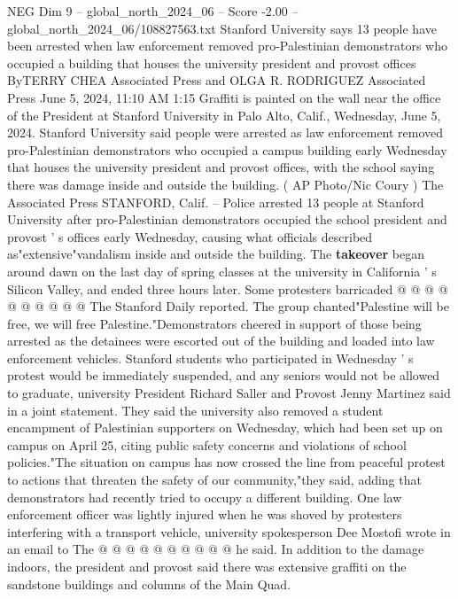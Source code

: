 \begin{textsample}{NEG Dim 9 – global\_north\_2024\_06 – Score -2.00 – global\_north\_2024\_06/108827563.txt}  \label{ex:f9_neg_173}
Stanford University says 13 people have been arrested when law enforcement removed pro-Palestinian demonstrators who occupied a building that houses the university president and provost offices ByTERRY CHEA Associated Press and OLGA R.
RODRIGUEZ Associated Press June 5, 2024, 11:10 AM 1:15 Graffiti is painted on the wall near the office of the President at Stanford University in Palo Alto, Calif., Wednesday, June 5, 2024.
Stanford University said people were arrested as law enforcement removed pro-Palestinian demonstrators who occupied a campus building early Wednesday that houses the university president and provost offices, with the school saying there was damage inside and outside the building. ( AP Photo/Nic Coury ) The Associated Press STANFORD, Calif. -- Police arrested 13 people at Stanford University after pro-Palestinian demonstrators occupied the school president and provost ' s offices early Wednesday, causing what officials described as"extensive"vandalism inside and outside the building.
The \textbf{takeover} began around dawn on the last day of spring classes at the university in California ' s Silicon Valley, and ended three hours later.
Some protesters barricaded @ @ @ @ @ @ @ @ @ @ The Stanford Daily reported.
The group chanted"Palestine will be free, we will free Palestine."Demonstrators cheered in support of those being arrested as the detainees were escorted out of the building and loaded into law enforcement vehicles.
Stanford students who participated in Wednesday ' s protest would be immediately suspended, and any seniors would not be allowed to graduate, university President Richard Saller and Provost Jenny Martinez said in a joint statement.
They said the university also removed a student encampment of Palestinian supporters on Wednesday, which had been set up on campus on April 25, citing public safety concerns and violations of school policies."The situation on campus has now crossed the line from peaceful protest to actions that threaten the safety of our community,"they said, adding that demonstrators had recently tried to occupy a different building.
One law enforcement officer was lightly injured when he was shoved by protesters interfering with a transport vehicle, university spokesperson Dee Mostofi wrote in an email to The @ @ @ @ @ @ @ @ @ @ he said.
In addition to the damage indoors, the president and provost said there was extensive graffiti on the sandstone buildings and columns of the Main Quad.

\end{textsample}
